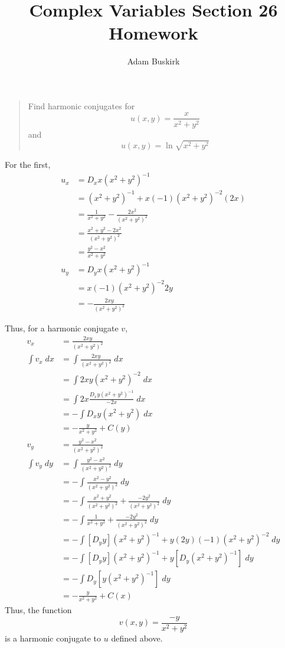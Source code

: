 \documentclass{article}
\title{Complex Variables Section 26 Homework}
\author{Adam Buskirk}
\theoremstyle{definition}
\newcommand{\sq}[1]{\left[#1\right]}
\begin{document}
\maketitle

\begin{quote}
Find harmonic conjugates for
\[ u(x,y) = \frac{x}{x^2+y^2} \]
and
\[ u(x,y) = \ln \sqrt{x^2+y^2} \]
\end{quote}

For the first,
\begin{align*}
u_x
&= D_x x (x^2+y^2)^{-1} \\
&= (x^2+y^2)^{-1} + x (-1) (x^2+y^2)^{-2} (2x) \\
&= \frac{1}{x^2+y^2} - \frac{2x^2}{(x^2+y^2)^2} \\
&= \frac{x^2+y^2 - 2x^2}{(x^2+y^2)^2} \\
&= \frac{y^2-x^2}{x^2+y^2} \\
u_y
&= D_y x (x^2+y^2)^{-1} \\
&= x (-1) (x^2+y^2)^{-2} 2y \\
&= - \frac{2xy}{(x^2+y^2)^2} 
\end{align*}

Thus, for a harmonic conjugate $v$,
\begin{align*}
v_x
&= \frac{2xy}{(x^2+y^2)^2} \\
\int v_x \;dx 
&= \int \frac{2xy}{(x^2+y^2)^2} \;dx \\
&= \int 2xy (x^2+y^2)^{-2} \;dx \\
&= \int 2x \frac{ D_x y(x^2+y^2)^{-1} }{-2x} \;dx \\
&= - \int D_x y(x^2+y^2) \;dx \\
&= - \frac{y}{x^2+y^2} + C(y) \\
v_y
&= \frac{y^2-x^2}{(x^2+y^2)^2} \\
\int v_y \;dy 
&=  \int \frac{y^2 - x^2}{(x^2+y^2)^2} \;dy \\
&= -\int \frac{x^2 - y^2}{(x^2+y^2)^2} \;dy \\
&= -\int \frac{x^2 + y^2}{(x^2+y^2)^2} + \frac{-2y^2}{(x^2+y^2)^2} \;dy \\
&= -\int \frac{1}{x^2+y^2} + \frac{-2y^2}{(x^2+y^2)^2} \;dy \\
&= -\int \sq{D_y y} (x^2+y^2)^{-1} + y (2y) (-1) (x^2+y^2)^{-2} \;dy \\
&= -\int \sq{D_y y} (x^2+y^2)^{-1} + y \sq{D_y (x^2+y^2)^{-1}} \;dy \\
&= -\int D_y \sq{y (x^2+y^2)^{-1}} \;dy \\
&= -\frac{y}{x^2+y^2} + C(x)
\end{align*}
Thus, the function 
\[ v(x,y) = \frac{-y}{x^2+y^2} \]
is a harmonic conjugate to $u$ defined above.
\end{document}
